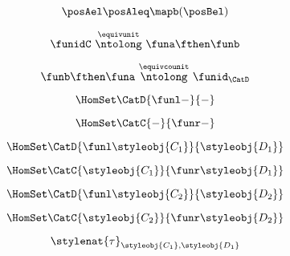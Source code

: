 {\begin{forslides}
        \begin{equation}
            \label{eq:slides_adjunctions_57}
            \posAel \posAleq \mapb(\posBel)
        \end{equation}

        \begin{equation}
            \label{eq:slides_adjunctions_58}
            \funidC \ \overset{\equivunit}{\ntolong}\ \funa \fthen \funb
        \end{equation}

        \begin{equation}
            \label{eq:slides_adjunctions_59}
            \funb \fthen \funa \ \overset{\equivcounit}{\ntolong}\ \funid_\CatD
        \end{equation}

        \begin{equation}
            \label{eq:slides_adjunctions_60}
            \HomSet\CatD{\funl -}{-}
        \end{equation}

        \begin{equation}
            \label{eq:slides_adjunctions_61}
            \HomSet\CatC{-}{\funr - }
        \end{equation}

        \begin{equation}
            \label{eq:slides_adjunctions_62}
            \HomSet\CatD{\funl \styleobj{C_1}}{\styleobj{D_1}}
        \end{equation}

        \begin{equation}
            \label{eq:slides_adjunctions_63}
            \HomSet\CatC{\styleobj{C_1}}{\funr \styleobj{D_1} }
        \end{equation}

        \begin{equation}
            \label{eq:slides_adjunctions_64}
            \HomSet\CatD{\funl \styleobj{C_2}}{\styleobj{D_2}}
        \end{equation}

        \begin{equation}
            \label{eq:slides_adjunctions_65}
            \HomSet\CatC{\styleobj{C_2}}{\funr \styleobj{D_2} }
        \end{equation}

        \begin{equation}
            \label{eq:slides_adjunctions_66}
            \stylenat{\tau}_{\styleobj{C_1},\styleobj{D_1}}
        \end{equation}


\end{forslides}}
